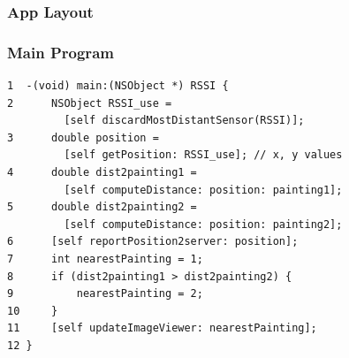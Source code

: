 \documentclass{beamer}
\begin{document}
\begin{frame}\frametitle{App Layout}
\begin{figure}
\centering
{}
\end{figure}
\end{frame}

\begin{frame}[fragile]\frametitle{Main Program}
\begin{verbatim}
1  -(void) main:(NSObject *) RSSI {
2      NSObject RSSI_use = 
         [self discardMostDistantSensor(RSSI)];
3      double position = 
         [self getPosition: RSSI_use]; // x, y values
4      double dist2painting1 = 
         [self computeDistance: position: painting1];
5      double dist2painting2 = 
         [self computeDistance: position: painting2];
6      [self reportPosition2server: position];
7      int nearestPainting = 1;
8      if (dist2painting1 > dist2painting2) {
9          nearestPainting = 2;
10     }
11     [self updateImageViewer: nearestPainting];
12 }
\end{verbatim}
\end{frame}
\end{document}
